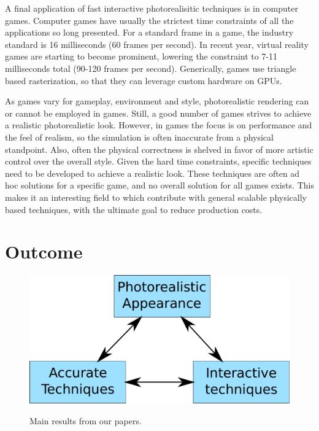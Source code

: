 A final application of fast interactive photorealisitic techniques is in computer games. Computer games have usually the strictest time constraints of all the applications so long presented. For a standard frame in a game, the industry standard is 16 milliseconds (60 frames per second). In recent year, virtual reality games are starting to become prominent, lowering the constraint to 7-11 milliseconds total (90-120 frames per second). Generically, games use triangle based rasterization, so that they can leverage custom hardware on GPUs. 

As games vary for gameplay, environment and style, photorealistic rendering can or cannot be employed in games. Still, a good number of games strives to achieve a realistic photorealistic look. However, in games the focus is on performance and the feel of realism, so the simulation is often inaccurate from a physical standpoint. Also, often the physical correctness is shelved in favor of more artistic control over the overall style. Given the hard time constraints, specific techniques need to be developed to achieve a realistic look. These techniques are often ad hoc solutions for a specific game, and no overall solution for all games exists. This makes it an interesting field to which contribute with general scalable physically based techniques, with the ultimate goal to reduce production costs.

\section{Outcome}

\begin{figure}
\centering
	 \includegraphics[draft,width=\textwidth]{figures/main_diagram}  \\
\caption{Main results from our papers.} 
\label{fig:main_results}
\end{figure}

